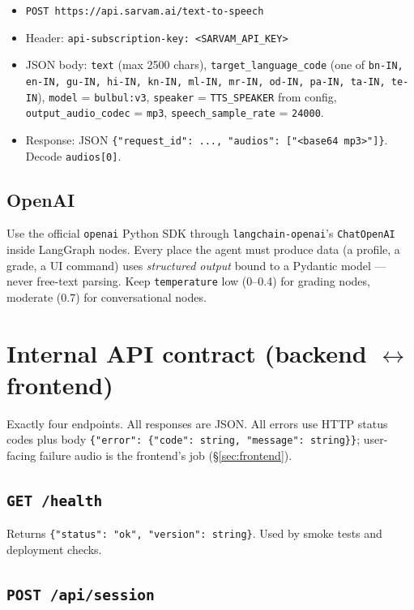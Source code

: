 \documentclass[11pt]{article}
\newcommand{\code}[1]{\texttt{#1}}
\begin{document}
\begin{itemize}
  \item \code{POST https://api.sarvam.ai/text-to-speech}
  \item Header: \code{api-subscription-key: <SARVAM\_API\_KEY>}
  \item JSON body: \code{text} (max 2500 chars), \code{target\_language\_code} (one of \code{bn-IN, en-IN, gu-IN, hi-IN, kn-IN, ml-IN, mr-IN, od-IN, pa-IN, ta-IN, te-IN}), \code{model} = \code{bulbul:v3}, \code{speaker} = \code{TTS\_SPEAKER} from config, \code{output\_audio\_codec} = \code{mp3}, \code{speech\_sample\_rate} = \code{24000}.
  \item Response: JSON \code{\{"request\_id": ..., "audios": ["<base64 mp3>"]\}}. Decode \code{audios[0]}.
\end{itemize}

\subsection{OpenAI}

Use the official \code{openai} Python SDK through \code{langchain-openai}'s \code{ChatOpenAI} inside LangGraph nodes. Every place the agent must produce data (a profile, a grade, a UI command) uses \emph{structured output} bound to a Pydantic model --- never free-text parsing. Keep \code{temperature} low (0--0.4) for grading nodes, moderate (0.7) for conversational nodes.

\section{Internal API contract (backend \(\leftrightarrow\) frontend)}
\label{sec:api}

Exactly four endpoints. All responses are JSON. All errors use HTTP status codes plus body \code{\{"error": \{"code": string, "message": string\}\}}; user-facing failure audio is the frontend's job (\S\ref{sec:frontend}).

\subsection{\code{GET /health}}

Returns \code{\{"status": "ok", "version": string\}}. Used by smoke tests and deployment checks.

\subsection{\code{POST /api/session}}
\end{document}

